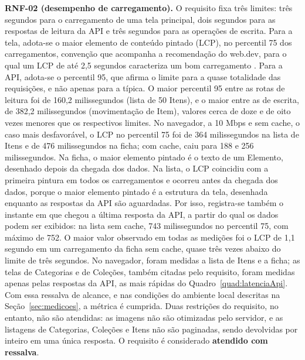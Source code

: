 \textbf{RNF-02 (desempenho de carregamento).} O requisito fixa três limites: três segundos para o carregamento de uma tela principal, dois segundos para as respostas de leitura da API e três segundos para as operações de escrita. Para a tela, adota-se o maior elemento de conteúdo pintado (LCP), no percentil 75 dos carregamentos, convenção que acompanha a recomendação do web.dev, para o qual um LCP de até 2,5 segundos caracteriza um bom carregamento \cite{walton2019lcp}. Para a API, adota-se o percentil 95, que afirma o limite para a quase totalidade das requisições, e não apenas para a típica. O maior percentil 95 entre as rotas de leitura foi de 160,2 milissegundos (lista de 50 Itens), e o maior entre as de escrita, de 382,2 milissegundos (movimentação de Item), valores cerca de doze e de oito vezes menores que os respectivos limites. No navegador, a 10 Mbps e sem cache, o caso mais desfavorável, o LCP no percentil 75 foi de 364 milissegundos na lista de Itens e de 476 milissegundos na ficha; com cache, caiu para 188 e 256 milissegundos. Na ficha, o maior elemento pintado é o texto de um Elemento, desenhado depois da chegada dos dados. Na lista, o LCP coincidiu com a primeira pintura em todos os carregamentos e ocorreu antes da chegada dos dados, porque o maior elemento pintado é a estrutura da tela, desenhada enquanto as respostas da API são aguardadas. Por isso, registra-se também o instante em que chegou a última resposta da API, a partir do qual os dados podem ser exibidos: na lista sem cache, 743 milissegundos no percentil 75, com máximo de 752. O maior valor observado em todas as medições foi o LCP de 1,1 segundo em um carregamento da ficha sem cache, quase três vezes abaixo do limite de três segundos. No navegador, foram medidas a lista de Itens e a ficha; as telas de Categorias e de Coleções, também citadas pelo requisito, foram medidas apenas pelas respostas da API, as mais rápidas do Quadro~\ref{quad:latenciaApi}. Com essa ressalva de alcance, e nas condições do ambiente local descritas na Seção~\ref{sec:medicoes}, a métrica é cumprida. Duas restrições do requisito, no entanto, não são atendidas: as imagens não são otimizadas pelo servidor, e as listagens de Categorias, Coleções e Itens não são paginadas, sendo devolvidas por inteiro em uma única resposta. O requisito é considerado \textbf{atendido com ressalva}.


